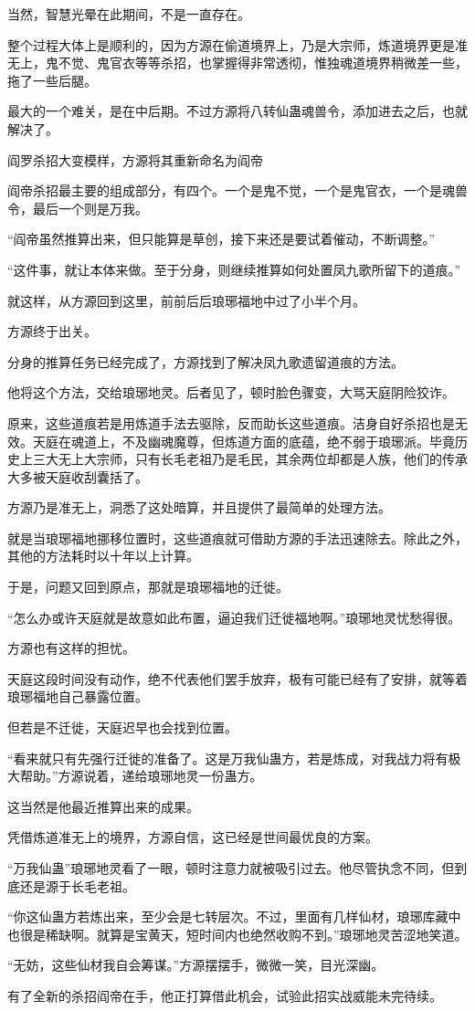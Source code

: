 \begin{this_body}
当然，智慧光晕在此期间，不是一直存在。

整个过程大体上是顺利的，因为方源在偷道境界上，乃是大宗师，炼道境界更是准无上，鬼不觉、鬼官衣等等杀招，也掌握得非常透彻，惟独魂道境界稍微差一些，拖了一些后腿。

最大的一个难关，是在中后期。不过方源将八转仙蛊魂兽令，添加进去之后，也就解决了。

阎罗杀招大变模样，方源将其重新命名为阎帝

阎帝杀招最主要的组成部分，有四个。一个是鬼不觉，一个是鬼官衣，一个是魂兽令，最后一个则是万我。

“阎帝虽然推算出来，但只能算是草创，接下来还是要试着催动，不断调整。”

“这件事，就让本体来做。至于分身，则继续推算如何处置凤九歌所留下的道痕。”

就这样，从方源回到这里，前前后后琅琊福地中过了小半个月。

方源终于出关。

分身的推算任务已经完成了，方源找到了解决凤九歌遗留道痕的方法。

他将这个方法，交给琅琊地灵。后者见了，顿时脸色骤变，大骂天庭阴险狡诈。

原来，这些道痕若是用炼道手法去驱除，反而助长这些道痕。洁身自好杀招也是无效。天庭在魂道上，不及幽魂魔尊，但炼道方面的底蕴，绝不弱于琅琊派。毕竟历史上三大无上大宗师，只有长毛老祖乃是毛民，其余两位却都是人族，他们的传承大多被天庭收刮囊括了。

方源乃是准无上，洞悉了这处暗算，并且提供了最简单的处理方法。

就是当琅琊福地挪移位置时，这些道痕就可借助方源的手法迅速除去。除此之外，其他的方法耗时以十年以上计算。

于是，问题又回到原点，那就是琅琊福地的迁徙。

“怎么办或许天庭就是故意如此布置，逼迫我们迁徙福地啊。”琅琊地灵忧愁得很。

方源也有这样的担忧。

天庭这段时间没有动作，绝不代表他们罢手放弃，极有可能已经有了安排，就等着琅琊福地自己暴露位置。

但若是不迁徙，天庭迟早也会找到位置。

“看来就只有先强行迁徙的准备了。这是万我仙蛊方，若是炼成，对我战力将有极大帮助。”方源说着，递给琅琊地灵一份蛊方。

这当然是他最近推算出来的成果。

凭借炼道准无上的境界，方源自信，这已经是世间最优良的方案。

“万我仙蛊”琅琊地灵看了一眼，顿时注意力就被吸引过去。他尽管执念不同，但到底还是源于长毛老祖。

“你这仙蛊方若炼出来，至少会是七转层次。不过，里面有几样仙材，琅琊库藏中也很是稀缺啊。就算是宝黄天，短时间内也绝然收购不到。”琅琊地灵苦涩地笑道。

“无妨，这些仙材我自会筹谋。”方源摆摆手，微微一笑，目光深幽。

有了全新的杀招阎帝在手，他正打算借此机会，试验此招实战威能未完待续。

\end{this_body}

